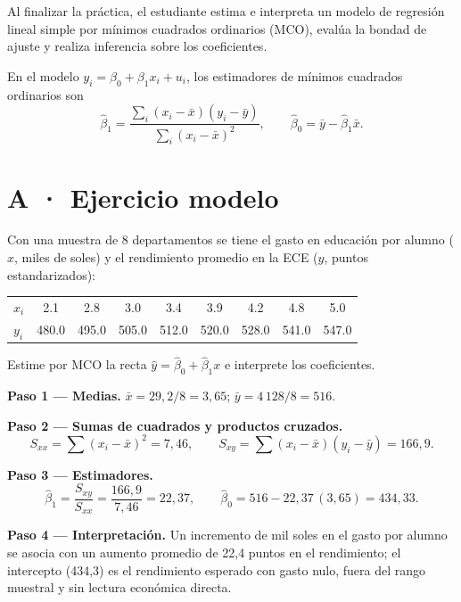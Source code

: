 \documentclass{evaluacion}
\begin{document}
\membrete

\begin{instrucciones}
Al finalizar la práctica, el estudiante estima e interpreta un modelo de
regresión lineal simple por mínimos cuadrados ordinarios (MCO), evalúa la
bondad de ajuste y realiza inferencia sobre los coeficientes.
\end{instrucciones}

\begin{definicion}
En el modelo $y_i = \beta_0 + \beta_1 x_i + u_i$, los estimadores de
mínimos cuadrados ordinarios son
\[
  \hat{\beta}_1 = \frac{\sum_{i}(x_i-\bar{x})(y_i-\bar{y})}
                       {\sum_{i}(x_i-\bar{x})^{2}},
  \qquad
  \hat{\beta}_0 = \bar{y} - \hat{\beta}_1\bar{x}.
\]
\end{definicion}

\section*{\color{colorprimario}A · Ejercicio modelo}

\begin{ejercicio}
Con una muestra de 8 departamentos se tiene el gasto en educación por
alumno ($x$, miles de soles) y el rendimiento promedio en la ECE ($y$,
puntos estandarizados):

\begin{datos}
\centering
\begin{tabular}{@{}l *{8}{S[table-format=3.1]}@{}}
  \toprule
  $x_i$ & 2.1 & 2.8 & 3.0 & 3.4 & 3.9 & 4.2 & 4.8 & 5.0\\
  $y_i$ & 480.0 & 495.0 & 505.0 & 512.0 & 520.0 & 528.0 & 541.0 & 547.0\\
  \bottomrule
\end{tabular}
\end{datos}

Estime por MCO la recta $\hat{y} = \hat{\beta}_0 + \hat{\beta}_1 x$ e
interprete los coeficientes.

\begin{desarrollo}
\textbf{Paso 1 — Medias.} $\bar{x} = 29{,}2/8 = 3{,}65$;\quad
$\bar{y} = 4\,128/8 = 516$.

\textbf{Paso 2 — Sumas de cuadrados y productos cruzados.}
\[
  S_{xx} = \sum (x_i-\bar{x})^{2} = 7{,}46, \qquad
  S_{xy} = \sum (x_i-\bar{x})(y_i-\bar{y}) = 166{,}9.
\]

\textbf{Paso 3 — Estimadores.}
\[
  \hat{\beta}_1 = \frac{S_{xy}}{S_{xx}} = \frac{166{,}9}{7{,}46}
  = 22{,}37,
  \qquad
  \hat{\beta}_0 = 516 - 22{,}37\,(3{,}65) = 434{,}33.
\]

\textbf{Paso 4 — Interpretación.} Un incremento de mil soles en el gasto
por alumno se asocia con un aumento promedio de 22,4 puntos en el
rendimiento; el intercepto (434,3) es el rendimiento esperado con gasto
nulo, fuera del rango muestral y sin lectura económica directa.
\end{desarrollo}
\end{ejercicio}
\end{document}
